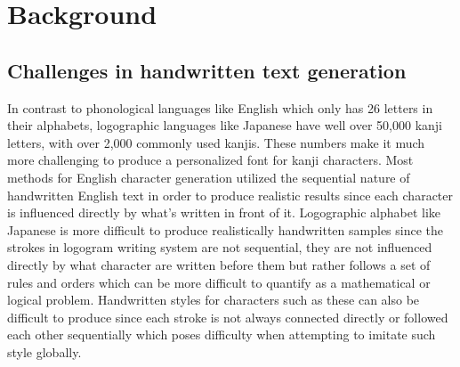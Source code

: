 \documentclass[12pt]{report}
\begin{document}
\newpage	
\chapter{Background}
\label{chap:background}

\section{Challenges in handwritten text generation}

In contrast to phonological languages like English which only has 26 letters in their alphabets, logographic languages like Japanese have well over 50,000 kanji letters, with over 2,000 commonly used kanjis. These numbers make it much more challenging to produce a personalized font for kanji characters.
Most methods for English character generation utilized the sequential nature of handwritten English text in order to produce realistic results since each character is influenced directly by what’s written in front of it. Logographic alphabet like Japanese is more difficult to produce realistically handwritten samples since the strokes in logogram writing system are not sequential, they are not influenced directly by what character are written before them but rather follows a set of rules and orders which can be more difficult to quantify as a mathematical or logical problem. Handwritten styles for characters such as these can also be difficult to produce since each stroke is not always connected directly or followed each other sequentially which poses difficulty when attempting to imitate such style globally.
\end{document}
